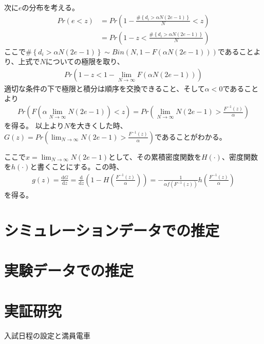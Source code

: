 \documentclass{jsarticle}
\begin{document}
次に$e$の分布を考える。
\begin{align*}
	Pr\left( e < z \right) &= Pr\left( 1 - \frac{\# \left\{ d_i > \alpha N (2 e - 1) \right\}}{N} < z \right)\\[8pt]
	&= Pr\left(1 - z < \frac{\# \left\{ d_i > \alpha N (2 e - 1) \right\}}{N} \right)
\end{align*}
ここで$\# \left\{ d_i > \alpha N (2 e - 1) \right\} \sim Bin(N, 1 - F(\alpha N (2 e - 1)))$であることより、上式で$N$についての極限を取り、
\begin{align*}
	Pr\left(1 - z < 1 - \lim_{N\to \infty}F(\alpha N (2e - 1))  \right)
\end{align*}
適切な条件の下で極限と積分は順序を交換できること、そして$\alpha < 0$であることより
\begin{align*}
	Pr\left(F(\alpha \lim_{N\to \infty} N (2e - 1)) < z \right) = Pr\left( \lim_{N\to \infty} N (2e-1) > \frac{F^{-1}(z)}{\alpha} \right)
\end{align*}
を得る。
以上より$N$を大きくした時、$G(z) = Pr\left( \lim_{N\to \infty} N (2e-1) > \frac{F^{-1}(z)}{\alpha} \right)$であることがわかる。

ここで$x = \lim_{N\to \infty} N (2e-1)$として、その累積密度関数を$H(\cdot)$、密度関数を$h(\cdot)$と書くことにする。この時、
\begin{align*}
	g(z) = \frac{\mathrm{d}G}{\mathrm{d}z} = \frac{\mathrm{d}}{\mathrm{d}z} \left( 1 - H\left(\frac{F^{-1}(z)}{\alpha}\right) \right) = -\frac{1}{\alpha f(F^{-1}(z))} h\left(\frac{F^{-1}(z)}{\alpha}\right)
\end{align*}
を得る。


\section{シミュレーションデータでの推定}

\section{実験データでの推定}

\section{実証研究}
入試日程の設定と満員電車
\end{document}
